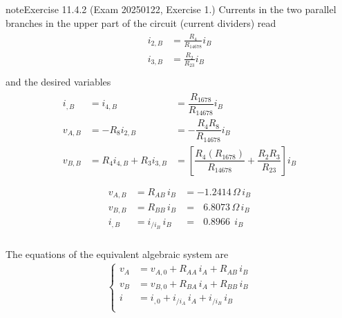 \documentclass[letterpaper,10pt,english]{jupyterBook}
\begin{document}
\begin{sphinxadmonition}{note}{Exercise 11.4.2 (Exam 2025\sphinxhyphen{}01\sphinxhyphen{}22, Exercise 1.)}
\sphinxAtStartPar
Currents in the two parallel branches in the upper part of the circuit (current dividers) read
\begin{equation*}
\begin{split}\begin{aligned}
  i_{2,B} & = \frac{R_4}{R_{14678}} i_B \\
  i_{3,B} & = \frac{R_2}{R_{23}} i_B \\
\end{aligned}\end{split}
\end{equation*}
\sphinxAtStartPar
and the desired variables
\begin{equation*}
\begin{split}\begin{aligned}
  i_{,B}  & = i_{4,B} & = \dfrac{R_{1678}}{R_{14678}} i_B \\
  v_{A,B} & = - R_8 i_{2,B} & = - \dfrac{R_4 R_8}{R_{14678}} i_B  \\
  v_{B,B} & = R_4 i_{4,B} + R_3 i_{3,B} & = \left[ \dfrac{R_4(R_{1678})}{R_{14678}} + \dfrac{R_2 R_3}{R_{23}} \right] i_B \\
\end{aligned}\end{split}
\end{equation*}\begin{equation*}
\begin{split}\begin{aligned}
 v_{A,B} & = R_{AB}   \, i_B & =     - 1.2414  \, \Omega \, i_B \\ 
 v_{B,B} & = R_{BB}   \, i_B & = \ \ \ 6.8073  \, \Omega \, i_B \\
   i_{,B}& = i_{/i_B} \, i_B & = \ \ \ 0.8966 \ \          i_B \\
\end{aligned}\end{split}
\end{equation*}
\begin{figure}[htbp]
\centering

\noindent{}
\end{figure}

\sphinxAtStartPar
The equations of the equivalent algebraic system are
\begin{equation*}
\begin{split}\begin{cases}
 v_A & = v_{A,0} + R_{AA}   \, i_A + R_{AB}   \, i_B \\
 v_B & = v_{B,0} + R_{BA}   \, i_A + R_{BB}   \, i_B \\
 i   & = i_{ ,0} + i_{/i_A} \, i_A + i_{/i_B} \, i_B \\
\end{cases}\end{split}
\end{equation*}



\end{sphinxadmonition}
\end{document}
